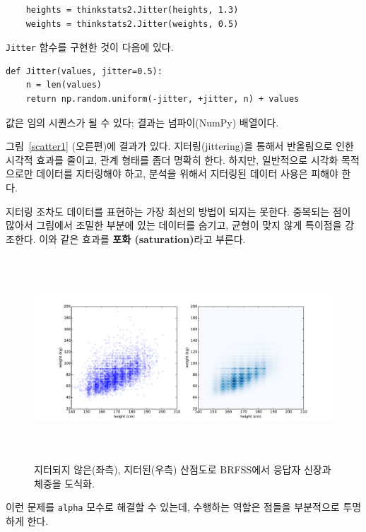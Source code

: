 
%
\begin{verbatim}
    heights = thinkstats2.Jitter(heights, 1.3)
    weights = thinkstats2.Jitter(weights, 0.5)
\end{verbatim}

{\tt Jitter} 함수를 구현한 것이 다음에 있다.

\begin{verbatim}
def Jitter(values, jitter=0.5):
    n = len(values)
    return np.random.uniform(-jitter, +jitter, n) + values
\end{verbatim}

값은 임의 시퀀스가 될 수 있다; 결과는 넘파이(NumPy) 배열이다.

그림~\ref{scatter1} (오른편)에 결과가 있다.
지터링(jittering)을 통해서 반올림으로 인한 시각적 효과를 줄이고,
관계 형태를 좀더 명확히 한다. 하지만, 일반적으로 시각화 목적으로만
데이터를 지터링해야 하고, 분석을 위해서 지터링된 데이터 사용은 피해야 한다.

지터링 조차도 데이터를 표현하는 가장 최선의 방법이 되지는 못한다.
중복되는 점이 많아서 그림에서 조밀한 부분에 있는 데이터를 숨기고,
균형이 맞지 않게 특이점을 강조한다. 이와 같은 효과를 {\bf 포화 (saturation)}라고 부른다.

\begin{figure}
\centerline{\includegraphics[height=3.0in]{figs/scatter2.pdf}}
\caption{지터되지 않은(좌측), 지터된(우측) 산점도로 BRFSS에서 응답자 신장과 체중을 도식화.}
\label{scatter2}
\end{figure}

이런 문제를 {\tt alpha} 모수로 해결할 수 있는데, 수행하는 역할은 점들을 부분적으로 투명하게 한다.

